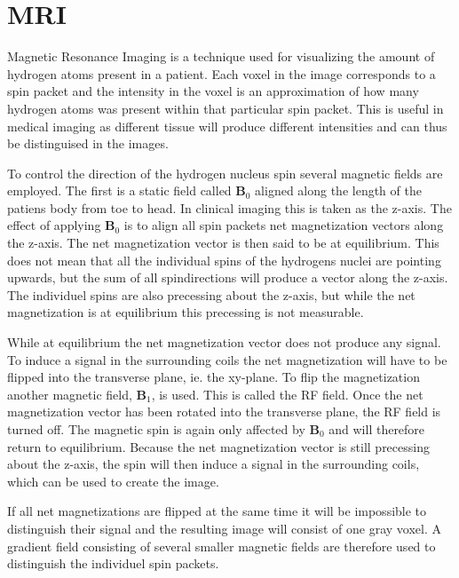\section{MRI}
\label{sec:MRI}


Magnetic Resonance Imaging is a technique used for visualizing the
amount of hydrogen atoms present in a patient. Each voxel in the image
corresponds to a spin packet and the intensity in the voxel is an
approximation of how many hydrogen atoms was present within that
particular spin packet. This is useful in medical imaging as different
tissue will produce different intensities and can thus be distinguised
in the images.


To control the direction of the hydrogen nucleus spin several
magnetic fields are employed. The first is a static field called
$\mathbf{B}_0$ aligned along the length of the patiens body from toe
to head. In clinical imaging this is taken as the z-axis. The effect
of applying $\mathbf{B}_0$ is to align all spin packets net
magnetization vectors along the z-axis. The net magnetization vector
is then said to be at equilibrium. This does not mean that all the
individual spins of the hydrogens nuclei are pointing upwards, but the
sum of all spindirections will produce a vector along the z-axis. The
individuel spins are also precessing about the z-axis, but while the
net magnetization is at equilibrium this precessing is not measurable.


While at equilibrium the net magnetization vector does not produce any
signal. To induce a signal in the surrounding coils the net
magnetization will have to be flipped into the transverse plane,
ie. the xy-plane. To flip the magnetization another magnetic field,
$\mathbf{B}_1$, is used. This is called the RF field. Once the net
magnetization vector has been rotated into the transverse plane, the
RF field is turned off. The magnetic spin is again only affected by
$\mathbf{B}_0$ and will therefore return to equilibrium. Because the
net magnetization vector is still precessing about the z-axis, the
spin will then induce a signal in the surrounding coils, which can be
used to create the image.


If all net magnetizations are flipped at the same time it will be
impossible to distinguish their signal and the resulting image will
consist of one gray voxel. A gradient field consisting of several
smaller magnetic fields are therefore used to distinguish the
individuel spin packets.


